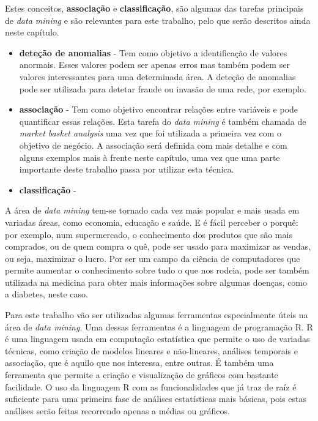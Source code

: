 Estes conceitos, \textbf{associação} e \textbf{classificação}, são algumas das tarefas principais de \textit{data mining} e são relevantes para este trabalho, pelo que serão descritos ainda neste capítulo.


\begin{itemize}

\item{\textbf{deteção de anomalias}} - 
Tem como objetivo a identificação de valores anormais. Esses valores podem ser apenas erros mas também podem ser valores interessantes para uma determinada área. A deteção de anomalias pode ser utilizada para detetar fraude ou invasão de uma rede, por exemplo.

\item{\textbf{associação}} - 
Tem como objetivo encontrar relações entre variáveis e pode quantificar essas relações. Esta tarefa do \textit{data mining} é também chamada de \textit{market basket analysis} uma vez que foi utilizada a primeira vez com o objetivo de negócio.\cite{business} A associação será definida com mais detalhe e com alguns exemplos mais à frente neste capítulo, uma vez que uma parte importante deste trabalho passa por utilizar esta técnica. 

\item{\textbf{classificação}} - 

\end{itemize}


A área de \textit{data mining} tem-se tornado cada vez mais popular e mais usada em variadas áreas, como economia, educação e saúde. E é fácil perceber o porquê: por exemplo, num supermercado, o conhecimento dos produtos que são mais comprados, ou de quem compra o quê, pode ser usado para maximizar as vendas, ou seja, maximizar o lucro.\cite{business} Por ser um campo da ciência de computadores que permite aumentar o conhecimento sobre tudo o que nos rodeia, pode ser também utilizada na medicina para obter mais informações sobre algumas doenças, como a diabetes, neste caso.

Para este trabalho vão ser utilizadas algumas ferramentas especialmente úteis na área de \textit{data mining}. Uma dessas ferramentas é a linguagem de programação R. R é uma linguagem usada em computação estatística que permite o uso de variadas técnicas, como criação de modelos lineares e não-lineares, análises temporais e associação, que é aquilo que nos interessa, entre outras. É também uma ferramenta que permite a criação e visualização de gráficos com bastante facilidade. O uso da linguagem R com as funcionalidades que já traz de raíz é suficiente para uma primeira fase de análises estatísticas mais básicas, pois estas análises serão feitas recorrendo apenas a médias ou gráficos.

